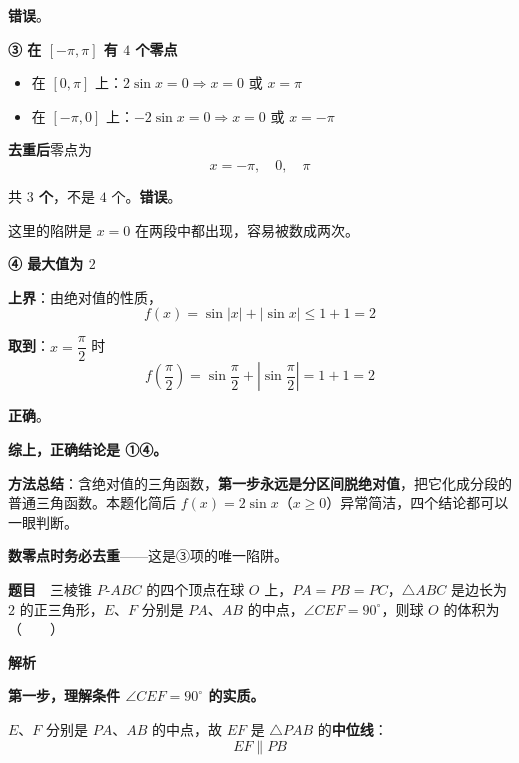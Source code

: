 \textbf{错误}。

\par\medskip

\textbf{③ 在 $[-\pi,\pi]$ 有 $4$ 个零点 }

\begin{itemize}
\item 在 $[0,\pi]$ 上：$2\sin x=0\Rightarrow x=0$ 或 $x=\pi$
\item 在 $[-\pi,0]$ 上：$-2\sin x=0\Rightarrow x=0$ 或 $x=-\pi$
\end{itemize}

\textbf{去重后}零点为
\[x=-\pi,\quad 0,\quad \pi\]

共 \textbf{$3$ 个}，不是 $4$ 个。\textbf{错误}。

\begin{gktip}
这里的陷阱是 $x=0$ 在两段中都出现，容易被数成两次。
\end{gktip}

\par\medskip

\textbf{④ 最大值为 $2$ }

\textbf{上界}：由绝对值的性质，
\[f(x)=\sin|x|+|\sin x|\le1+1=2\]

\textbf{取到}：$x=\dfrac\pi2$ 时
\[f\left(\frac\pi2\right)=\sin\frac\pi2+\left|\sin\frac\pi2\right|=1+1=2\]

\textbf{正确}。

\textbf{综上，正确结论是 ①④。}


\begin{gktip}
\textbf{方法总结}：含绝对值的三角函数，\textbf{第一步永远是分区间脱绝对值}，把它化成分段的普通三角函数。本题化简后 $f(x)=2\sin x$（$x\ge0$）异常简洁，四个结论都可以一眼判断。

\textbf{数零点时务必去重}——这是③项的唯一陷阱。
\end{gktip}

\par\medskip


\textbf{题目}　三棱锥 $P\text{-}ABC$ 的四个顶点在球 $O$ 上，$PA=PB=PC$，$\triangle ABC$ 是边长为 $2$ 的正三角形，$E$、$F$ 分别是 $PA$、$AB$ 的中点，$\angle CEF=90^\circ$，则球 $O$ 的体积为（　　）

\textbf{解析}

\textbf{第一步，理解条件 $\angle CEF=90^\circ$ 的实质。}

$E$、$F$ 分别是 $PA$、$AB$ 的中点，故 $EF$ 是 $\triangle PAB$ 的\textbf{中位线}：
\[EF\parallel PB\]

